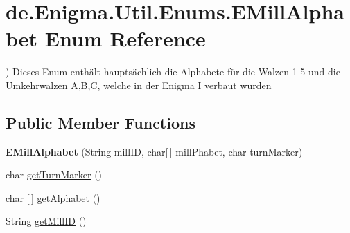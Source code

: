 \hypertarget{enumde_1_1_enigma_1_1_util_1_1_enums_1_1_e_mill_alphabet}{}\section{de.\+Enigma.\+Util.\+Enums.\+E\+Mill\+Alphabet Enum Reference}
\label{enumde_1_1_enigma_1_1_util_1_1_enums_1_1_e_mill_alphabet}


) Dieses Enum enthält hauptsächlich die Alphabete für die Walzen 1-\/5 und die Umkehrwalzen A,B,C, welche in der Enigma I verbaut wurden  


\subsection*{Public Member Functions}
\begin{DoxyCompactItemize}
\item 
\mbox{\label{enumde_1_1_enigma_1_1_util_1_1_enums_1_1_e_mill_alphabet_a758a01583486a28c58814f4b9655d8e2}} 
{\bfseries E\+Mill\+Alphabet} (String mill\+ID, char\mbox{[}$\,$\mbox{]} mill\+Phabet, char turn\+Marker)
\item 
char \hyperlink{enumde_1_1_enigma_1_1_util_1_1_enums_1_1_e_mill_alphabet_a0e912c02d1cc35b4ff6637674bcc7c58}{get\+Turn\+Marker} ()
\item 
char \mbox{[}$\,$\mbox{]} \hyperlink{enumde_1_1_enigma_1_1_util_1_1_enums_1_1_e_mill_alphabet_a42738303dfbfa63d512306b1102a93cf}{get\+Alphabet} ()
\item 
String \hyperlink{enumde_1_1_enigma_1_1_util_1_1_enums_1_1_e_mill_alphabet_a69675608ee623ace1204f2cd46483034}{get\+Mill\+ID} ()
\end{DoxyCompactItemize}

